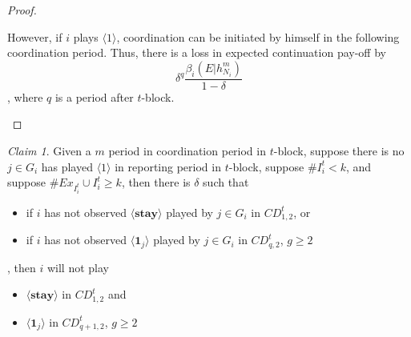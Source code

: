 \documentclass[12pt,letterpaper]{article}
\newtheorem*{main result}{Main Result}
\theoremstyle{definition}
\theoremstyle{remark}
\theoremstyle{claim}
\newtheorem{claim}{Claim}
\begin{document}
\begin{proof}
\begin{itemize}
However, if $i$ plays $\langle 1 \rangle$, coordination can be initiated by himself in the following coordination period. Thus, there is a loss in expected continuation pay-off by
\[\delta^{q}\frac{\beta_{i}(E|h^{m}_{N_i})}{1-\delta} \], where $q$ is a period after $t$-block.
\end{itemize}

\end{proof}




\begin{claim} 
\label{claim_report_with_no_message_coordination_period}
Given a $m$ period in coordination period in $t$-block, suppose there is no $j\in G_i$ has played $\langle 1 \rangle$ in reporting period in $t$-block, suppose $\# I^t_i<k$, and suppose $\# Ex_{I^{t}_i}\cup I^{t}_i \geq k$, then there is $\delta$ such that 
\begin{itemize}
\item if $i$ has not observed $\langle \textbf{stay} \rangle$ played by $j\in G_i$ in $CD^t_{1,2}$, or
\item if $i$ has not observed $\langle \mathbf{1}_j \rangle$ played by $j\in G_i$ in $CD^t_{q,2}$, $g\geq 2$
\end{itemize}
, then $i$ will not play
\begin{itemize}
\item $\langle \textbf{stay} \rangle$  in $CD^t_{1,2}$ and
\item $\langle \mathbf{1}_j \rangle$  in $CD^t_{q+1,2}$, $g\geq 2$
\end{itemize}
\end{claim}
\end{document}
